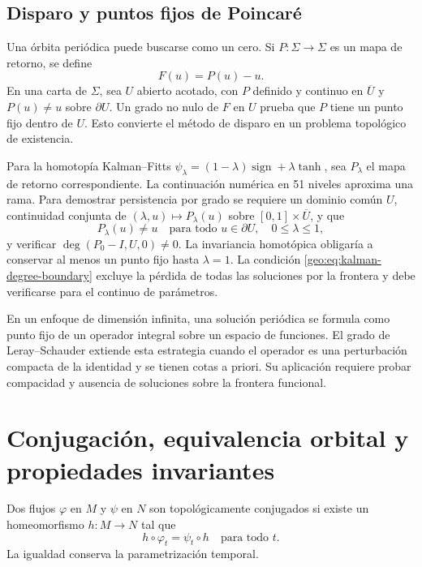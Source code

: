 \subsection{Disparo y puntos fijos de Poincaré}

Una órbita periódica puede buscarse como un cero. Si \(P:\Sigma\to\Sigma\) es
un mapa de retorno, se define
\begin{equation}
 F(u)=P(u)-u.
 \label{geo:eq:fixed-point-residual}
\end{equation}
En una carta de \(\Sigma\), sea \(U\) abierto acotado, con \(P\) definido
y continuo en \(\overline U\) y \(P(u)\ne u\) sobre \(\partial U\).
Un grado no nulo de \(F\) en \(U\) prueba que \(P\) tiene un
punto fijo dentro de \(U\). Esto convierte el método de disparo en un problema
topológico de existencia.

Para la homotopía Kalman--Fitts
\(\psi_\lambda=(1-\lambda)\operatorname{sign}+\lambda\tanh\), sea
\(P_\lambda\) el mapa de retorno correspondiente. La continuación numérica en
51 niveles aproxima una rama. Para demostrar persistencia por grado se
requiere un dominio común \(U\), continuidad conjunta de
\((\lambda,u)\mapsto P_\lambda(u)\) sobre
\([0,1]\times\overline U\), y que
\begin{equation}
 P_\lambda(u)\ne u
 \quad\text{para todo }u\in\partial U,
 \quad 0\le\lambda\le1,
 \label{geo:eq:kalman-degree-boundary}
\end{equation}
y verificar
\(\deg(P_0-I,U,0)\ne0\). La invariancia homotópica obligaría a conservar al
menos un punto fijo hasta \(\lambda=1\). La condición
\eqref{geo:eq:kalman-degree-boundary} excluye la pérdida de todas las
soluciones por la frontera y debe verificarse para el continuo de parámetros.

En un enfoque de dimensión infinita, una solución periódica se formula como
punto fijo de un operador integral sobre un espacio de funciones. El grado de
Leray--Schauder extiende esta estrategia cuando el operador es una
perturbación compacta de la identidad y se tienen cotas a priori. Su aplicación
requiere probar compacidad y ausencia de soluciones sobre la frontera
funcional.

\section{Conjugación, equivalencia orbital y propiedades invariantes}
\label{sec:geo-equivalence}

\begin{definition}
Dos flujos \(\varphi\) en \(M\) y \(\psi\) en \(N\) son topológicamente
conjugados si existe un homeomorfismo \(h:M\to N\) tal que
\begin{equation}
 h\circ\varphi_t=\psi_t\circ h
 \quad\text{para todo }t.
 \label{geo:eq:topological-conjugacy}
\end{equation}
La igualdad conserva la parametrización temporal.
\end{definition}


